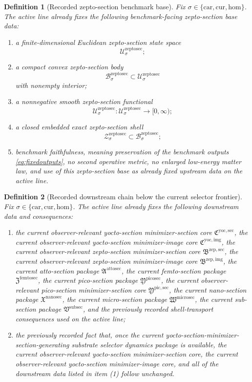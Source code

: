 \documentclass[11pt]{article}
\newcommand{\Car}{\mathrm{car}}
\newcommand{\Cur}{\mathrm{cur}}
\newcommand{\Hom}{\mathrm{hom}}
\newcommand{\SubSectionPackage}{\mathfrak V^{\mathrm{subsec}}}
\newcommand{\MicroSectionPackage}{\mathfrak W^{\mathrm{microsec}}}
\newcommand{\NanoSectionPackage}{\mathfrak X^{\mathrm{nanosec}}}
\newcommand{\PicoSectionPackage}{\mathfrak Y^{\mathrm{picosec}}}
\newcommand{\PicoMinSectionCore}{\mathfrak Y^{\mathrm{pic,sec}}}
\newcommand{\FemtoSectionPackage}{\mathfrak Z^{\mathrm{femtosec}}}
\newcommand{\AttoSectionPackage}{\mathfrak A^{\mathrm{attosec}}}
\newcommand{\ZeptoImageCore}{\mathfrak B^{\mathrm{zep,img}}}
\newcommand{\ZeptoMinSectionCore}{\mathfrak B^{\mathrm{zep,sec}}}
\newcommand{\ZeptoSectionSpace}[1]{\mathcal U_{#1}^{\mathrm{zeptosec}}}
\newcommand{\ZeptoSectionBody}[1]{\mathcal B_{#1}^{\mathrm{zeptosec}}}
\newcommand{\ZeptoSectionFunctional}[1]{\mathscr U_{#1}^{\mathrm{zeptosec}}}
\newcommand{\ZeptoSectionShell}[1]{\mathcal Z_{#1}^{\mathrm{zeptosec}}}
\newcommand{\YoctoImageCore}{\mathfrak C^{\mathrm{yoc,img}}}
\newcommand{\YoctoMinSectionCore}{\mathfrak C^{\mathrm{yoc,sec}}}
\newtheorem{definition}{Definition}
\begin{document}
\begin{definition}[Recorded zepto-section benchmark base]
\label{def:zeptobase}
Fix \(\sigma\in\{\Car,\Cur,\Hom\}\). The active line already fixes the following benchmark-facing zepto-section base data:
\begin{enumerate}
    \item a finite-dimensional Euclidean zepto-section state space
    \[
    \ZeptoSectionSpace{\sigma};
    \]
    \item a compact convex zepto-section body
    \[
    \ZeptoSectionBody{\sigma}\subset\ZeptoSectionSpace{\sigma}
    \]
    with nonempty interior;
    \item a nonnegative smooth zepto-section functional
    \[
    \ZeptoSectionFunctional{\sigma}:\ZeptoSectionSpace{\sigma}\to[0,\infty);
    \]
    \item a closed embedded exact zepto-section shell
    \[
    \ZeptoSectionShell{\sigma}\subset\ZeptoSectionBody{\sigma};
    \]
    \item benchmark faithfulness, meaning preservation of the benchmark outputs \eqref{eq:fixedoutputs}, no second operative metric, no enlarged low-energy matter law, and use of this zepto-section base as already fixed upstream data on the active line.
\end{enumerate}
\end{definition}

\begin{definition}[Recorded downstream chain below the current selector frontier]
\label{def:downstream}
Fix \(\sigma\in\{\Car,\Cur,\Hom\}\). The active line already fixes the following downstream data and consequences:
\begin{enumerate}
    \item the current observer-relevant yocto-section minimizer-section core \(\YoctoMinSectionCore\), the current observer-relevant yocto-section minimizer-image core \(\YoctoImageCore\), the current observer-relevant zepto-section minimizer-section core \(\ZeptoMinSectionCore\), the current observer-relevant zepto-section minimizer-image core \(\ZeptoImageCore\), the current atto-section package \(\AttoSectionPackage\), the current femto-section package \(\FemtoSectionPackage\), the current pico-section package \(\PicoSectionPackage\), the current observer-relevant pico-section minimizer-section core \(\PicoMinSectionCore\), the current nano-section package \(\NanoSectionPackage\), the current micro-section package \(\MicroSectionPackage\), the current sub-section package \(\SubSectionPackage\), and the previously recorded shell-transport consequences used on the active line;
    \item the previously recorded fact that, once the current yocto-section-minimizer-section-generating substrate selector dynamics package is available, the current observer-relevant yocto-section minimizer-section core, the current observer-relevant yocto-section minimizer-image core, and all of the downstream data listed in item (1) follow unchanged.
\end{enumerate}
\end{definition}
\end{document}

